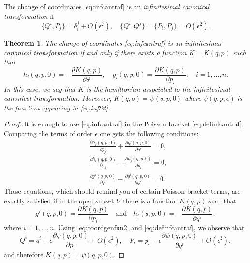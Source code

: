 \documentclass[english,fontsize=11pt,paper=a5,oneside]{scrbook}
\newtheorem{theorem}{Theorem}[chapter]
\theoremstyle{definition}
\begin{document}
\begin{tcolorbox}
    The change of coordinates \eqref{eq:infcantraf} is an \emph{infinitesimal canonical transformation} if
    \begin{equation}\label{eq:definfcantraf}
        \big\{Q^i, P_j\big\} = \delta_i^j + O(\epsilon^2), \quad
        \big\{Q^i, Q^j\big\} =  \big\{P_i, P_j\big\} = O(\epsilon^2).
    \end{equation} 
\end{tcolorbox}

\begin{theorem}
    The change of coordinates \eqref{eq:infcantraf} is an infinitesimal canonical transformation if and only if there exists a function $K=K(q,p)$ such that
    \begin{equation}
        h_i(q,p,0) = -\frac{\partial K(q,p)}{\partial q^i}, \quad
        g_i(q,p,0) = \frac{\partial K(q,p)}{\partial p_i}, \quad
        i=1,\ldots,n.
    \end{equation}
    In this case, we say that $K$ is the hamiltonian associated to the infinitesimal canonical transformation. Moreover, $K(q,p) = \psi(q,p,0)$ where $\psi(q,p,\epsilon)$ is the function appearing in \eqref{eq:infS2}.
\end{theorem}
\begin{proof}
    It is enough to use \eqref{eq:infcantraf} in the Poisson bracket \eqref{eq:definfcantraf}.
    Comparing the terms of order $\epsilon$ one gets the following conditions:
    \begin{align}
        &\frac{\partial h_i(q,p,0)}{\partial p_j} + \frac{\partial g^j(q,p,0)}{\partial q^i} = 0,\\
        &\frac{\partial h_i(q,p,0)}{\partial p_j} - \frac{\partial h_j(q,p,0)}{\partial p_i} = 0,\\
        &\frac{\partial g^j(q,p,0)}{\partial q^i} - \frac{\partial g^i(q,p,0)}{\partial q^j} = 0.
    \end{align}
    These equations, which should remind you of certain Poisson bracket terms, are exactly satisfied if in the open subset $U$ there is a function $K(q,p)$ such that
    \begin{equation}
        g^i(q,p,0) = \frac{\partial K(q,p)}{\partial p_i}
        \quad\mbox{and}\quad
        h_i(q,p,0) = -\frac{\partial K(q,p)}{\partial q^i},
    \end{equation}
    where $i=1,\ldots,n$.
    Using \eqref{eq:coordgenfun2} and \eqref{eq:definfcantraf}, we observe that
    \begin{equation}
        Q^i = q^i + \epsilon \frac{\partial \psi(q,p,0)}{\partial p_i} + O(\epsilon^2),\quad
        P_i = p_i - \epsilon \frac{\partial \psi(q,p,0)}{\partial q^i} + O(\epsilon^2),
    \end{equation}
    and therefore $K(q,p) = \psi(q,p,0)$.
\end{proof}
\end{document}
